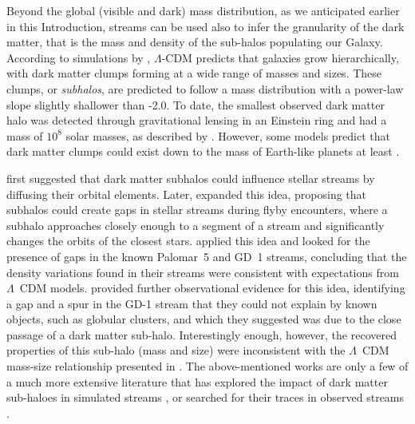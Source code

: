 \documentclass[draft]{aa}
\begin{document}
  
  Beyond the global (visible and dark) mass distribution, as we anticipated earlier in this Introduction, streams can be used also to infer the granularity of the dark matter, that is the mass and density of the sub-halos populating our Galaxy. According to simulations by \citet{2008MNRAS.391.1685S}, $\Lambda$-CDM predicts that galaxies grow hierarchically, with dark matter clumps forming at a wide range of masses and sizes. These clumps, or \textit{subhalos}, are predicted to follow a mass distribution with a power-law slope slightly shallower than -2.0. To date, the smallest observed dark matter halo was detected through gravitational lensing in an Einstein ring and had a mass of $10^8$ solar masses, as described by \citet{2012Natur.481..341V}. However, some models predict that dark matter clumps could exist down to the mass of Earth-like planets at least \citep[see][ and discussion in \citet{2021arXiv211101148A} ]{2005JCAP...08..003G, wang20}. 

  \citet{2002MNRAS.332..915I} first suggested that dark matter subhalos could influence stellar streams by diffusing their orbital elements. Later, \citet{2012ApJ...748...20C} expanded this idea, proposing that subhalos could create gaps in stellar streams during flyby encounters, where a subhalo approaches closely enough to a segment of a stream and significantly changes the orbits of the closest stars.  \citet{2012ApJ...760...75C, 2013ApJ...768..171C} applied this idea and looked for the presence of gaps in the known Palomar~5 and GD~1 streams, concluding that the density variations found in their streams were consistent with expectations from $\Lambda$~CDM models.  \citet{2019ApJ...880...38B} provided further observational evidence for this idea, identifying a gap and a spur in the GD-1 stream that they could not explain by known objects, such as globular clusters, and which they suggested was due to the close passage of a dark matter sub-halo. Interestingly enough, however, the recovered properties of this sub-halo (mass and size) were inconsistent with the $\Lambda$~CDM mass-size relationship presented in \cite{2017MNRAS.466.4974M}. The above-mentioned works are only a few of a much more extensive literature that has explored the impact of dark matter sub-haloes in simulated streams \citep{2016ApJ...828L..10H, 2021MNRAS.507.1999H, 2021JCAP...10..043B, 2024arXiv240402953H, 2024arXiv241021174N}, or searched for their traces in observed streams \citep{2016MNRAS.460.2711T, 2017MNRAS.470...60E, 2020ApJ...889...70B, 2020ApJ...892L..37B}.
\end{document}
